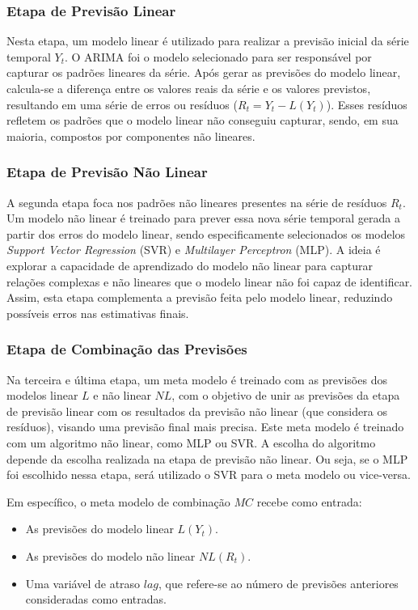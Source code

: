 \subsubsection{Etapa de Previsão Linear}

Nesta etapa, um modelo linear é utilizado para realizar a previsão inicial da série temporal \(Y_t\). O ARIMA foi o modelo selecionado para ser responsável por capturar os padrões lineares da série. Após gerar as previsões do modelo linear, calcula-se a diferença entre os valores reais da série e os valores previstos, resultando em uma série de erros ou resíduos (\(R_t = Y_t - L(Y_t)\)). Esses resíduos refletem os padrões que o modelo linear não conseguiu capturar, sendo, em sua maioria, compostos por componentes não lineares.

\subsubsection{Etapa de Previsão Não Linear}

A segunda etapa foca nos padrões não lineares presentes na série de resíduos \(R_t\). Um modelo não linear é treinado para prever essa nova série temporal gerada a partir dos erros do modelo linear, sendo especificamente selecionados os modelos \textit{Support Vector Regression} (SVR) e \textit{Multilayer Perceptron} (MLP). A ideia é explorar a capacidade de aprendizado do modelo não linear para capturar relações complexas e não lineares que o modelo linear não foi capaz de identificar. Assim, esta etapa complementa a previsão feita pelo modelo linear, reduzindo possíveis erros nas estimativas finais.

\subsubsection{Etapa de Combinação das Previsões}

Na terceira e última etapa, um meta modelo é treinado com as previsões dos modelos linear $L$ e não linear $NL$, com o objetivo de unir as previsões da etapa de previsão linear com os resultados da previsão não linear (que considera os resíduos), visando uma previsão final mais precisa. Este meta modelo é treinado com um algoritmo não linear, como MLP ou SVR. A escolha do algoritmo depende da escolha realizada na etapa de previsão não linear. Ou seja, se o MLP foi escolhido nessa etapa, será utilizado o SVR para o meta modelo ou vice-versa.

Em específico, o meta modelo de combinação \(MC\) recebe como entrada:
\begin{itemize}
    \item As previsões do modelo linear \(L(Y_t)\).
    \item As previsões do modelo não linear \(NL(R_t)\).
    \item Uma variável de atraso \(lag\), que refere-se ao número de previsões anteriores consideradas como entradas.
\end{itemize}

